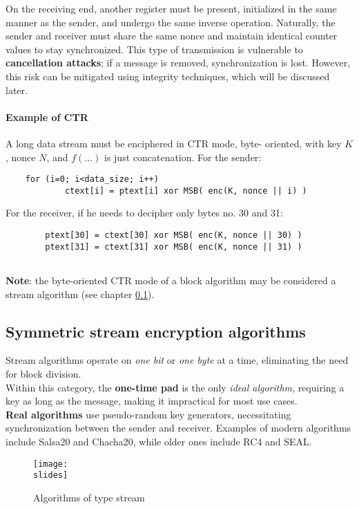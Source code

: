 On the receiving end, another register must be present, initialized in the same manner as the sender, and undergo the same inverse operation. Naturally, the sender and receiver must share the same nonce and maintain identical counter values to stay synchronized. This type of transmission is vulnerable to \textbf{cancellation attacks}; if a message is removed, synchronization is lost. However, this risk can be mitigated using integrity techniques, which will be discussed later.

\paragraph*{Example of CTR}
A long data stream must be enciphered in CTR mode, byte-
oriented, with key $K$, nonce $N$, and $f(...)$ is just concatenation.
For the sender:
\begin{verbatim}
    for (i=0; i<data_size; i++)
            ctext[i] = ptext[i] xor MSB( enc(K, nonce || i) )
\end{verbatim}
For the receiver, if he needs to decipher only bytes no. 30 and 31:
\begin{verbatim}
        ptext[30] = ctext[30] xor MSB( enc(K, nonce || 30) )
        ptext[31] = ctext[31] xor MSB( enc(K, nonce || 31) )
    
\end{verbatim}

\textbf{Note}: the byte-oriented CTR mode of a block algorithm may be considered a stream algorithm (see chapter \ref{chap:symmetricstream}).

\newpage
\subsection{Symmetric stream encryption algorithms}\label{chap:symmetricstream}

Stream algorithms operate on \textit{one bit} or \textit{one byte} at a time, eliminating the need for block division. \\
Within this category, the \textbf{one-time pad} is the only \textit{ideal algorithm}, requiring a key as long as the message, making it impractical for most use cases.\\
\textbf{Real algorithms} use pseudo-random key generators, necessitating synchronization between the sender and receiver. Examples of modern algorithms include Salsa20 and Chacha20, while older ones include RC4 and SEAL.

\begin{figure}[h]
    \centering
    \texttt{[image: \\slides]}
    \caption{Algorithms of type stream}
\end{figure}

